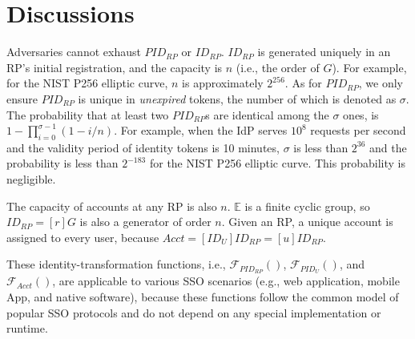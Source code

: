 \section{Discussions}
\label{sec:discussion}



 Adversaries cannot exhaust $PID_{RP}$ or $ID_{RP}$.
$ID_{RP}$ is generated uniquely in an RP's initial registration,
    and the capacity is $n$ (i.e., the order of $G$). For example, for the NIST P256 elliptic curve, $n$ is approximately $2^{256}$.
As for $PID_{RP}$,  we only ensure $PID_{RP}$ is unique in \emph{unexpired} tokens,
    the number of which is denoted as $\sigma$.
The probability that at least two $PID_{RP}$s are identical among the $\sigma$ ones,
    is $1-\prod_{i=0}^{\sigma-1}(1-i/n)$.
For example,
    when the IdP serves $10^{8}$ requests per second and the validity period of identity tokens is 10 minutes,
     $\sigma$ is less than $2^{36}$ and the probability is less than $2^{-183}$ for the NIST P256 elliptic curve.
This probability is negligible.

The capacity of accounts at any RP is also $n$.
$\mathbb{E}$ is a finite cyclic group,
    so $ID_{RP} = [r]G$ is also a generator of order $n$.
Given an RP,
    a unique account is assigned to every user,
        because $Acct =  [ID_U]ID_{RP} = [u]ID_{RP}$.

\vspace{0.8mm}
These identity-transformation functions, i.e., $\mathcal{F}_{PID_{RP}}()$, $\mathcal{F}_{PID_U}()$, and $\mathcal{F}_{Acct}()$,
    are applicable to various SSO scenarios
        (e.g., web application, mobile App, and native software),
    because these functions follow the common model of popular SSO protocols
    and do not depend on any special implementation or runtime.



